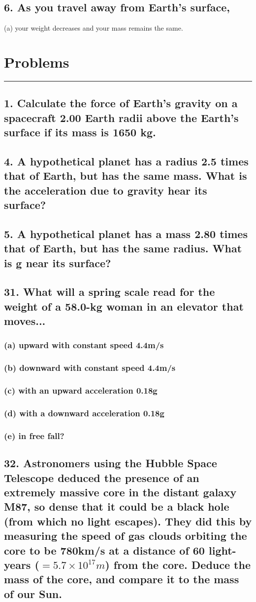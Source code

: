 \documentclass[12pt,a4paper,english]{article}
\begin{document}
\begin{flushleft}
  \subsection{6. As you travel away from Earth's surface,}
  (a) your weight decreases and your mass remains the same. 
  \section*{Problems}
  \hrule
  \subsection{1. Calculate the force of Earth's gravity on a spacecraft 2.00 Earth radii above the Earth's surface if its mass is 1650 kg.}
  \subsection{4. A hypothetical planet has a radius 2.5 times that of Earth, but has the same mass. What is the acceleration due to gravity hear its surface?}
  \subsection{5. A hypothetical planet has a mass 2.80 times that of Earth, but has the same radius. What is g near its surface?}
  \subsection{31. What will a spring scale read for the weight of a 58.0-kg woman in an elevator that moves...}
  \subsubsection{(a) upward with constant speed 4.4m/s}
  \subsubsection{(b) downward with constant speed 4.4m/s}
  \subsubsection{(c) with an upward acceleration 0.18g}
  \subsubsection{(d) with a downward acceleration 0.18g}
  \subsubsection{(e) in free fall?}
  \subsection{32. Astronomers using the Hubble Space Telescope deduced the presence of an extremely massive core in the distant galaxy M87, so dense that it could be a black hole (from which no light escapes). They did this by measuring the speed of gas clouds orbiting the core to be 780km/s at a distance of 60 light-years ($=5.7\times10^{17}m$) from the core. Deduce the mass of the core, and compare it to the mass of our Sun.}
\end{flushleft}
\end{document}
